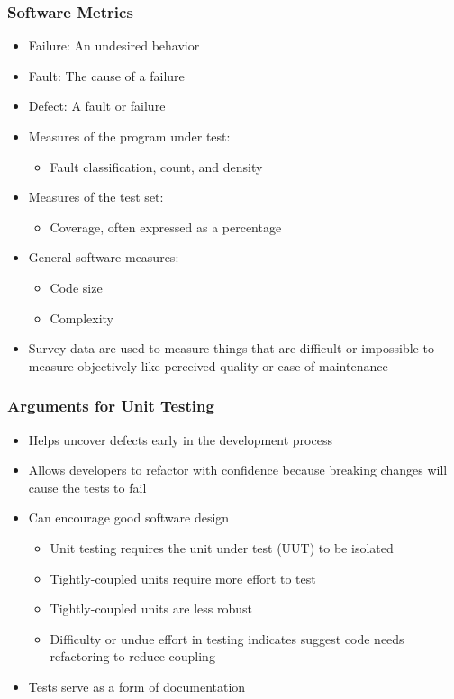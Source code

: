 \documentclass{beamer}
\begin{document}
\begin{frame}
\frametitle{Software Metrics}
\begin{itemize}
	\item Failure: An undesired behavior
	\item Fault: The cause of a failure
	\item Defect: A fault or failure
	\item Measures of the program under test:
	\begin{itemize}
		\item Fault classification, count, and density
	\end{itemize}
	\item Measures of the test set:
	\begin{itemize}
		\item Coverage, often expressed as a percentage
	\end{itemize}
	\item General software measures:
	\begin{itemize}
		\item Code size
		\item Complexity
	\end{itemize}
	\item Survey data are used to measure things that are difficult or impossible to measure objectively like perceived quality or ease of maintenance
\end{itemize}
\end{frame}

\begin{frame}
\frametitle{Arguments for Unit Testing}
\begin{itemize}
	\item Helps uncover defects early in the development process
	\item Allows developers to refactor with confidence because breaking changes will cause the tests to fail
	\item Can encourage good software design
	\begin{itemize}
		\item Unit testing requires the unit under test (UUT) to be isolated
		\item Tightly-coupled units require more effort to test
		\item Tightly-coupled units are less robust
		\item Difficulty or undue effort in testing indicates suggest code needs refactoring to reduce coupling
	\end{itemize}
	\item Tests serve as a form of documentation
\end{itemize}
\end{frame}
\end{document}
